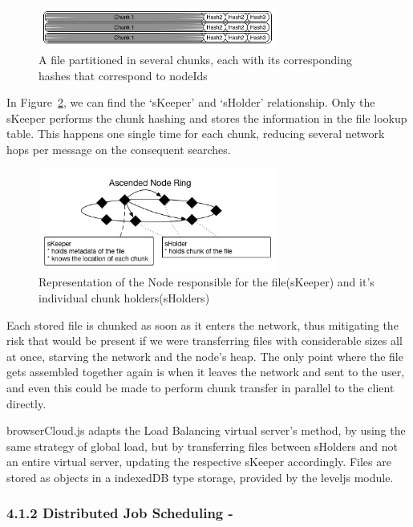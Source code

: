 \begin{figure}[h!]
  \centering
  \includegraphics[width=0.7\textwidth]{img/chunking.jpg}
  \caption{A file partitioned in several chunks, each with its corresponding hashes that correspond to nodeIds}
  \label{fig:chunking}
\end{figure}

In Figure~\ref{fig:skeepersholder}, we can find the `sKeeper' and `sHolder' relationship. Only the sKeeper performs the chunk hashing and stores the information in the file lookup table. This happens one single time for each chunk, reducing several network hops per message on the consequent searches.

\begin{figure}[h!]
  \centering
  \includegraphics[width=0.7\textwidth]{img/skeepersholder.jpg}
  \caption{Representation of the Node responsible for the file(sKeeper) and it's individual chunk holders(sHolders)}
  \label{fig:skeepersholder}
\end{figure}

Each stored file is chunked as soon as it enters the network, thus mitigating the risk that would be present if we were transferring files with considerable sizes all at once, starving the network and the node's heap. The only point where the file gets assembled together again is when it leaves the network and sent to the user, and even this could be made to perform chunk transfer in parallel to the client directly.

browserCloud.js adapts the Load Balancing virtual server's method, by using the same strategy of global load, but by transferring files between sHolders and not an entire virtual server, updating the respective sKeeper accordingly. Files are stored as objects in a indexedDB type storage, provided by the leveljs module.

\subsubsection{4.1.2 Distributed Job Scheduling -}


